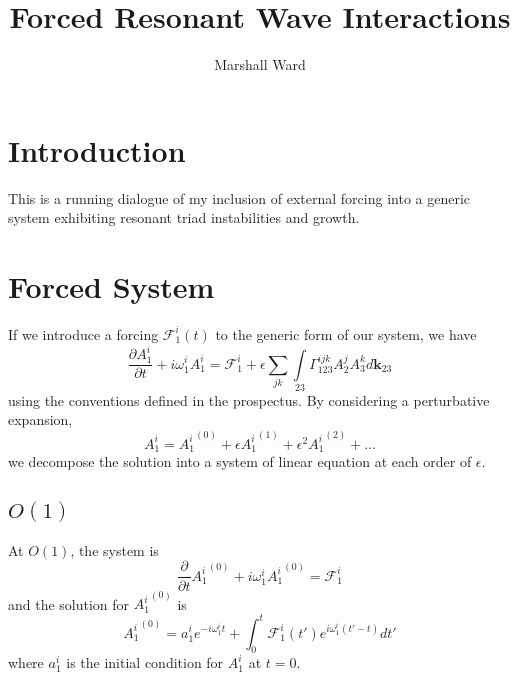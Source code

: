 \documentclass[letterpaper, 11pt]{article}
\title{Forced Resonant Wave Interactions}
\author{Marshall Ward}
\newcommand{\pdiff}[2]{\frac{\partial #1}{\partial #2}}
\begin{document}
\maketitle


\section{Introduction}

This is a running dialogue of my inclusion of external forcing into a generic system exhibiting resonant triad instabilities and growth.


\section{Forced System}

If we introduce a forcing $\mathcal{F}^i_1(t)$ to the generic form of our system, we have
\begin{equation}
\pdiff{A^i_1}{t} + i \omega^i_1 A^i_1 = \mathcal{F}^i_1 + \epsilon \sum_{jk}\int\limits_{23} \Gamma^{ijk}_{123} A^j_2 A^k_3 d\mathbf{k}_{23}
\end{equation}
using the conventions defined in the prospectus. By considering a perturbative expansion,
\begin{equation}
A^i_1 = {A^i_1}^{(0)} + \epsilon {A^i_1}^{(1)} + \epsilon^2 {A^i_1}^{(2)} + \ldots
\end{equation}
we decompose the solution into a system of linear equation at each order of $\epsilon$.

\subsection{$O(1)$}

At $O(1)$, the system is
\begin{equation}
\pdiff{}{t}{A^i_1}^{(0)} + i \omega^i_1 {A^i_1}^{(0)} = \mathcal{F}^i_1
\end{equation}
and the solution for ${A^i_1}^{(0)}$ is
\begin{equation}
{A^i_1}^{(0)} = a^i_1 e^{-i \omega^i_1 t} + \int_0^t \mathcal{F}^i_1(t') e^{i \omega^i_1 (t' - t)} dt'
\end{equation}
where $a^i_1$ is the initial condition for $A^i_1$ at $t = 0$.
\end{document}
